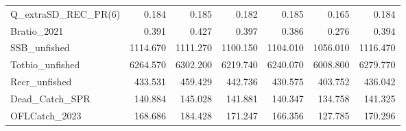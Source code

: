 \documentclass[
  english,
  a4paper,
]{article}
\begin{document}
\begin{table}
{\begin{tabular}[t]{lrrrrrr}
Q\_extraSD\_REC\_PR(6) & 0.184 & 0.185 & 0.182 & 0.185 & 0.165 & 0.184\\
Bratio\_2021 & 0.391 & 0.427 & 0.397 & 0.386 & 0.276 & 0.394\\
SSB\_unfished & 1114.670 & 1111.270 & 1100.150 & 1104.010 & 1056.010 & 1116.470\\
Totbio\_unfished & 6264.570 & 6302.200 & 6219.740 & 6240.070 & 6008.800 & 6279.770\\
Recr\_unfished & 433.531 & 459.429 & 442.736 & 430.575 & 403.752 & 436.042\\
Dead\_Catch\_SPR & 140.884 & 145.028 & 141.881 & 140.347 & 134.758 & 141.325\\
OFLCatch\_2023 & 168.686 & 184.428 & 171.247 & 166.356 & 127.785 & 170.296\\
\bottomrule
\end{tabular}}
\end{table}
\end{document}
